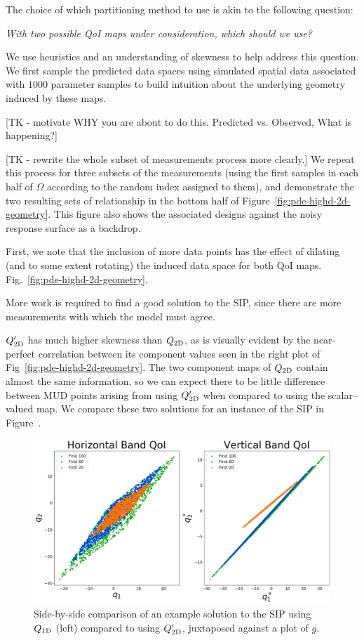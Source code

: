 The choice of which partitioning method to use is akin to the following question:
\begin{center}
\emph{With two possible QoI maps under consideration, which should we use?}
\end{center}

We use heuristics and an understanding of skewness to help address this question.
We first sample the predicted data spaces using simulated spatial data associated with $1000$ parameter samples to build intuition about the underlying geometry induced by these maps.

[TK - motivate WHY you are about to do this. Predicted vs. Observed, What is happening?]

[TK - rewrite the whole subset of measurements process more clearly.]
We repeat this process for three subsets of the measurements (using the first samples in each half of $\Omega$ according to the random index assigned to them), and demonstrate the two resulting sets of relationship in the bottom half of Figure~\ref{fig:pde-highd-2d-geometry}.
This figure also shows the associated designs against the noisy response surface as a backdrop.

First, we note that the inclusion of more data points has the effect of dilating (and to some extent rotating) the induced data space for both QoI maps.
Fig.~\ref{fig:pde-highd-2d-geometry}.

More work is required to find a good solution to the SIP, since there are more measurements with which the model must agree.


$Q_\text{2D}^\prime$ has much higher skewness than $Q_\text{2D}$, as is visually evident by the near-perfect correlation between its component values seen in the right plot of Fig~\ref{fig:pde-highd-2d-geometry}.
The two component maps of $Q_\text{2D}$ contain almost the same information, so we can expect there to be little difference between MUD points arising from using $Q_\text{2D}^\prime$ when compared to using the scalar--valued map.
We compare these two solutions for an instance of the SIP in Figure~.

\begin{figure}
[TK - fix figure]
  \includegraphics[width=0.95\linewidth]{figures/pde-highd/pde-highd_geom_D2.png}
\caption{
Side-by-side comparison of an example solution to the SIP using $Q_\text{1D}$ (left) compared to using $Q_\text{2D}^\prime$, juxtaposed against a plot of $g$.
}
\label{fig:pde-highd-2d-scalar-vs-alt}
\end{figure}

